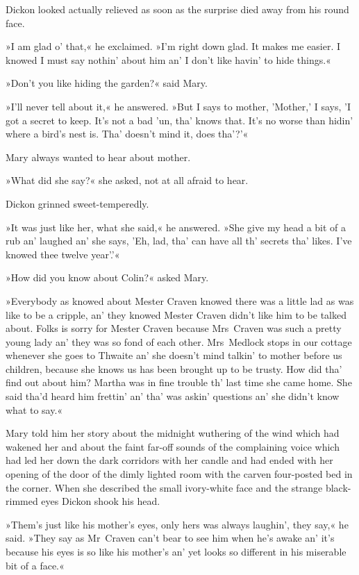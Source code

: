 Dickon looked actually relieved as soon as the surprise died away from his round face.

»I am glad o' that,« he exclaimed. »I'm right down glad. It makes me easier. I knowed I must say nothin' about him an' I don't like havin' to hide things.«

»Don't you like hiding the garden?« said Mary.

»I'll never tell about it,« he answered. »But I says to mother, 'Mother,' I says, 'I got a secret to keep. It's not a bad 'un, tha' knows that. It's no worse than hidin' where a bird's nest is. Tha' doesn't mind it, does tha'?'«

Mary always wanted to hear about mother.

»What did she say?« she asked, not at all afraid to hear.

Dickon grinned sweet-temperedly.

»It was just like her, what she said,« he answered. »She give my head a bit of a rub an' laughed an' she says, 'Eh, lad, tha' can have all th' secrets tha' likes. I've knowed thee twelve year'.'«

»How did you know about Colin?« asked Mary.

»Everybody as knowed about Mester Craven knowed there was a little lad as was like to be a cripple, an' they knowed Mester Craven didn't like him to be talked about. Folks is sorry for Mester Craven because Mrs~Craven was such a pretty young lady an' they was so fond of each other. Mrs~Medlock stops in our cottage whenever she goes to Thwaite an' she doesn't mind talkin' to mother before us children, because she knows us has been brought up to be trusty. How did tha' find out about him? Martha was in fine trouble th' last time she came home. She said tha'd heard him frettin' an' tha' was askin' questions an' she didn't know what to say.«

Mary told him her story about the midnight wuthering of the wind which had wakened her and about the faint far-off sounds of the complaining voice which had led her down the dark corridors with her candle and had ended with her opening of the door of the dimly lighted room with the carven four-posted bed in the corner. When she described the small ivory-white face and the strange black-rimmed eyes Dickon shook his head.

»Them's just like his mother's eyes, only hers was always laughin', they say,« he said. »They say as Mr~Craven can't bear to see him when he's awake an' it's because his eyes is so like his mother's an' yet looks so different in his miserable bit of a face.«

